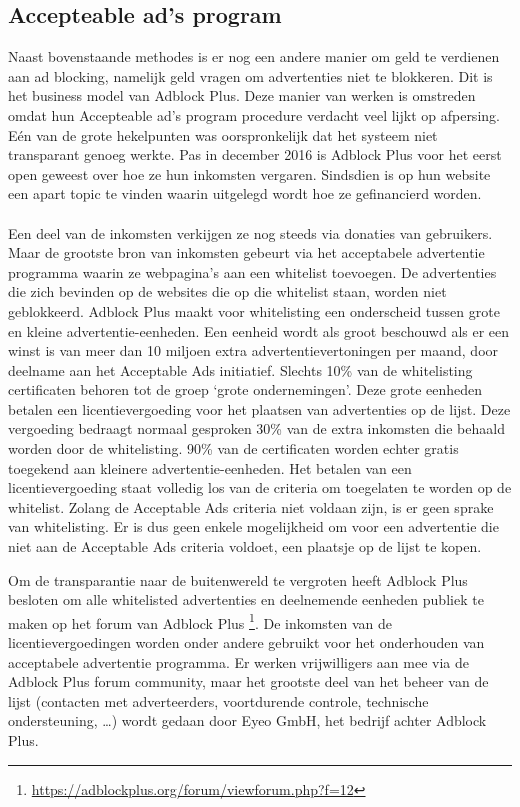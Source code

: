 \documentclass[pdftex,a4paper,12pt,twoside]{report}
\begin{document}
\subsection{ Accepteable ad's program}
\label{sec:Accepteable ad's program}
Naast bovenstaande methodes is er nog een andere manier om geld te verdienen aan ad blocking, namelijk geld vragen om advertenties niet te blokkeren. Dit is het business model van Adblock Plus. Deze manier van werken is omstreden omdat hun Accepteable ad's program procedure verdacht veel lijkt op afpersing. Eén van de grote hekelpunten was oorspronkelijk dat het systeem niet transparant genoeg werkte. Pas in december 2016 is Adblock Plus voor het eerst open geweest over hoe ze hun inkomsten vergaren. Sindsdien is op hun website een apart topic te vinden waarin uitgelegd wordt hoe ze gefinancierd worden. 
\\
\\
Een deel van de inkomsten verkijgen ze nog steeds via donaties van gebruikers.
Maar de grootste bron van inkomsten gebeurt via het acceptabele advertentie programma waarin ze webpagina's aan een whitelist toevoegen. De advertenties die zich bevinden op de websites die op die whitelist staan, worden niet geblokkeerd. 
Adblock Plus maakt voor whitelisting een onderscheid tussen grote en kleine advertentie-eenheden. Een eenheid wordt als groot beschouwd als er een winst is van meer dan 10 miljoen extra advertentievertoningen per maand, door deelname aan het Acceptable Ads initiatief. Slechts 10\% van de whitelisting certificaten behoren tot de groep ‘grote ondernemingen’. Deze grote eenheden betalen een licentievergoeding voor het plaatsen van advertenties op de lijst. Deze vergoeding bedraagt normaal gesproken 30\% van de extra inkomsten die behaald worden door de whitelisting. 90\% van de certificaten worden echter gratis toegekend aan kleinere advertentie-eenheden. Het betalen van een licentievergoeding staat volledig los van de criteria om toegelaten te worden op de whitelist. Zolang de Acceptable Ads criteria niet voldaan zijn, is er geen sprake van whitelisting. Er is dus geen enkele mogelijkheid om voor een advertentie die niet aan de Acceptable Ads criteria voldoet, een plaatsje op de lijst te kopen.

Om de transparantie naar de buitenwereld te vergroten heeft Adblock Plus besloten om alle whitelisted advertenties en deelnemende eenheden publiek te maken op het forum van Adblock Plus \footnote{\url{https://adblockplus.org/forum/viewforum.php?f=12}}.
De inkomsten van de licentievergoedingen worden onder andere gebruikt voor het onderhouden van acceptabele advertentie programma. Er werken vrijwilligers aan mee via de Adblock Plus forum community, maar het grootste deel van het beheer van de lijst (contacten met adverteerders, voortdurende controle, technische ondersteuning, …) wordt gedaan  door Eyeo GmbH, het bedrijf achter Adblock Plus.
\end{document}
